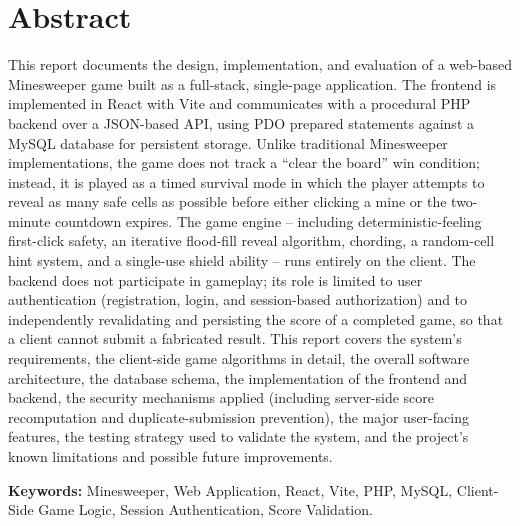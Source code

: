 \chapter*{Abstract}

This report documents the design, implementation, and evaluation of a web-based
Minesweeper game built as a full-stack, single-page application. The frontend is
implemented in React with Vite and communicates with a procedural PHP backend
over a JSON-based API, using PDO prepared statements against a MySQL database
for persistent storage. Unlike traditional Minesweeper implementations, the game
does not track a ``clear the board'' win condition; instead, it is played as a
timed survival mode in which the player attempts to reveal as many safe cells as
possible before either clicking a mine or the two-minute countdown expires. The
game engine -- including deterministic-feeling first-click safety, an iterative
flood-fill reveal algorithm, chording, a random-cell hint system, and a single-use
shield ability -- runs entirely on the client. The backend does not participate in
gameplay; its role is limited to user authentication (registration, login, and
session-based authorization) and to independently revalidating and persisting the
score of a completed game, so that a client cannot submit a fabricated result.
This report covers the system's requirements, the client-side game algorithms in
detail, the overall software architecture, the database schema, the implementation
of the frontend and backend, the security mechanisms applied (including
server-side score recomputation and duplicate-submission prevention), the major
user-facing features, the testing strategy used to validate the system, and the
project's known limitations and possible future improvements.

\vspace{1em}
\noindent \textbf{Keywords:} Minesweeper, Web Application, React, Vite, PHP,
MySQL, Client-Side Game Logic, Session Authentication, Score Validation.

